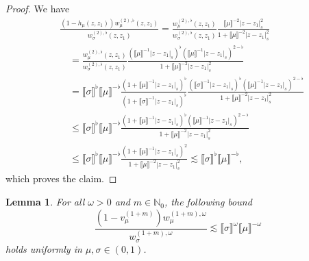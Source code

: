 \documentclass{article}
\numberwithin{equation}{section}
\theoremstyle{plain}
\newtheorem{lemma}[theorem]{Lemma}
\theoremstyle{definition}
\begin{document}
\begin{proof}
  We have
  \[ \begin{aligned}
       &\frac{(1 - h_{\mu} (z, z_1)) w^{(2), \flat}_{\mu} (z, z_1)}{w^{(2),
       \flat}_{\sigma} (z, z_1)}  =  \frac{w^{(2), \flat}_{\mu} (z,
       z_1)}{w^{(2), \flat}_{\sigma} (z, z_1)} \frac{\llbracket \mu
       \rrbracket^{- 2} | z - z_1 |_s^2}{1 + \llbracket \mu \rrbracket^{- 2} |
       z - z_1 |_s^2}\\
       &\quad =  \frac{w^{(2), \flat}_{\mu} (z, z_1)}{w^{(2), \flat}_{\sigma} (z,
       z_1)} \frac{(\llbracket \mu \rrbracket^{- 1} | z - z_1 |_s)^{\flat}
       (\llbracket \mu \rrbracket^{- 1} | z - z_1 |_s)^{2 - \flat}}{1 +
       \llbracket \mu \rrbracket^{- 2} | z - z_1 |_s^2}\\
       &\quad =  \llbracket \sigma \rrbracket^{\flat} \llbracket \mu
       \rrbracket^{- \flat} \frac{(1 + \llbracket \mu \rrbracket^{- 1} | z -
       z_1 |_s)^{\flat}}{(1 + \llbracket \sigma \rrbracket^{- 1} | z - z_1
       |_s)^{\flat}} \frac{(\llbracket \sigma \rrbracket^{- 1} | z - z_1
       |_s)^{\flat} (\llbracket \mu \rrbracket^{- 1} | z - z_1 |_s)^{2 -
       \flat}}{1 + \llbracket \mu \rrbracket^{- 2} | z - z_1 |_s^2}\\
       &\quad \leqslant  \llbracket \sigma \rrbracket^{\flat} \llbracket \mu
       \rrbracket^{- \flat} \frac{(1 + \llbracket \mu \rrbracket^{- 1} | z -
       z_1 |_s)^{\flat} (\llbracket \mu \rrbracket^{- 1} | z - z_1 |_s)^{2 -
       \flat}}{1 + \llbracket \mu \rrbracket^{- 2} | z - z_1 |_s^2}\\
       &\quad \leqslant  \llbracket \sigma \rrbracket^{\flat} \llbracket \mu
       \rrbracket^{- \flat} \frac{(1 + \llbracket \mu \rrbracket^{- 1} | z -
       z_1 |_s)^2}{1 + \llbracket \mu \rrbracket^{- 2} | z - z_1 |_s^2}
       \lesssim \llbracket \sigma \rrbracket^{\flat} \llbracket \mu
       \rrbracket^{- \flat},
     \end{aligned} \]
  which proves the claim.
\end{proof}

\begin{lemma}
  \label{lem:weight-interaction-v}For all $\omega > 0$ and $m\in\mathbb N_0$, the following bound
  \[ \frac{(1 - v^{(1 + m)}_{\mu}) w^{(1 + m), \omega}_{\mu}}{w^{(1 + m),
     \omega}_{\sigma}} \lesssim \llbracket \sigma \rrbracket^{\omega}
     \llbracket \mu \rrbracket^{- \omega} \]
  holds uniformly in $\mu, \sigma \in (0, 1)$.
\end{lemma}
\end{document}
